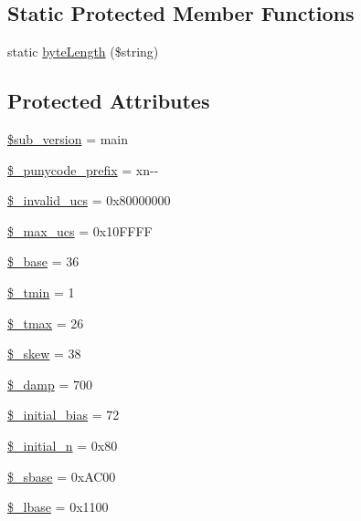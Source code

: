 \subsection*{Static Protected Member Functions}
\begin{DoxyCompactItemize}
\item 
static \hyperlink{classidna__convert_a964eafd23cc4069f6aa9912bcdfb61c7}{byte\+Length} (\$string)
\end{DoxyCompactItemize}
\subsection*{Protected Attributes}
\begin{DoxyCompactItemize}
\item 
\hyperlink{classidna__convert_a14d96b4efeba28496661be46a6f14a5c}{\$sub\+\_\+version} = \textquotesingle{}main\textquotesingle{}
\item 
\hyperlink{classidna__convert_a314677b13ded35e088abec26ef7c8be8}{\$\+\_\+punycode\+\_\+prefix} = \textquotesingle{}xn-\/-\/\textquotesingle{}
\item 
\hyperlink{classidna__convert_a741bab9cbe7aec53249d714143bbe53b}{\$\+\_\+invalid\+\_\+ucs} = 0x80000000
\item 
\hyperlink{classidna__convert_aea20377d4d2659186a1901d6a66f5d58}{\$\+\_\+max\+\_\+ucs} = 0x10\+F\+F\+F\+F
\item 
\hyperlink{classidna__convert_ae8b8b5bddd4d164dea30f7097274ac24}{\$\+\_\+base} = 36
\item 
\hyperlink{classidna__convert_a25ba1aab448cedd1159da1a09fb97720}{\$\+\_\+tmin} = 1
\item 
\hyperlink{classidna__convert_a44dfb166546f087150aa6c1ffdde2473}{\$\+\_\+tmax} = 26
\item 
\hyperlink{classidna__convert_ae444bd5e85604ec097705a95ab21f144}{\$\+\_\+skew} = 38
\item 
\hyperlink{classidna__convert_af291107adc3fc7062e734fe5654a5b4c}{\$\+\_\+damp} = 700
\item 
\hyperlink{classidna__convert_a9baf9ea9ebceee6e4dffb60cce1d20bc}{\$\+\_\+initial\+\_\+bias} = 72
\item 
\hyperlink{classidna__convert_a02dd88f575541a67a6312a15af340733}{\$\+\_\+initial\+\_\+n} = 0x80
\item 
\hyperlink{classidna__convert_ab4e5849131d5a242fc67d3bb75f81899}{\$\+\_\+sbase} = 0x\+A\+C00
\item 
\hyperlink{classidna__convert_a50c50cda465aefe78b8ed69ae6cd6247}{\$\+\_\+lbase} = 0x1100

\end{DoxyCompactItemize}
